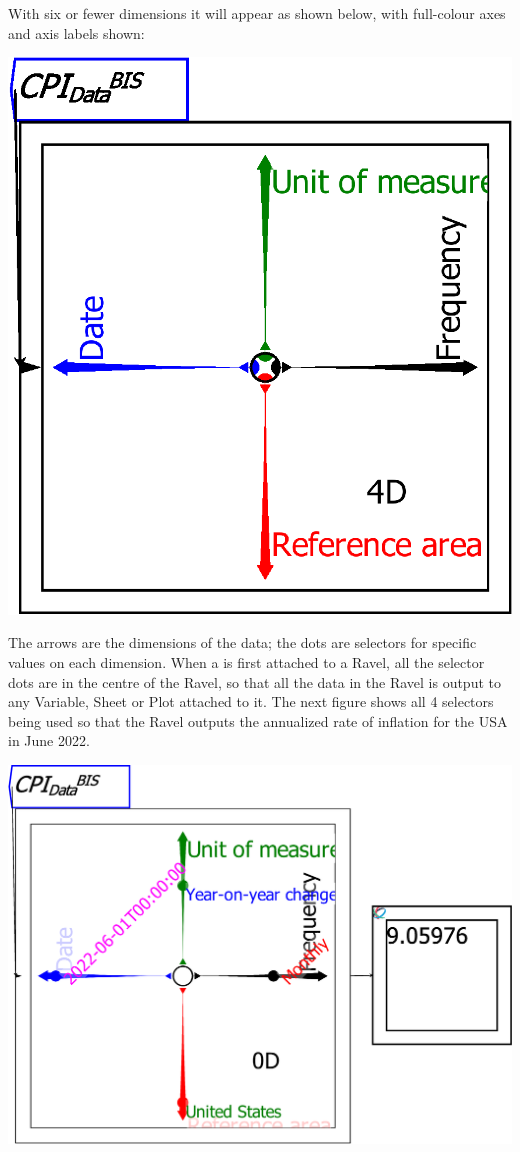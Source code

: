 With six or fewer dimensions it will appear as shown below, with full-colour
axes and axis labels shown:

\begin{center}
  \includegraphics[width=.7\textwidth]{images/RavelDataImporting02}
\end{center}

The arrows are the dimensions of the data; the dots are selectors
for specific values on each dimension. When a  is first attached to a Ravel, all the selector
dots are in the centre of the Ravel, so that all the data in the Ravel
is output to any Variable, Sheet or Plot attached to it. The next
figure shows all 4 selectors being used so that the Ravel outputs
the annualized rate of inflation for the USA in June 2022.

\noindent\includegraphics[width=\textwidth]{images/RavelSingleDataPointSelected}

